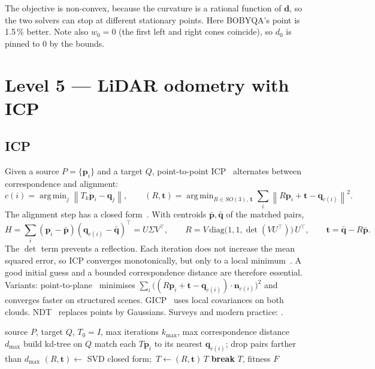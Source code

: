 \documentclass[10pt,a4paper]{scrartcl}
\renewcommand{\emph}[1]{\textcolor{accent}{#1}}
\newcommand{\code}[1]{\texttt{#1}}
\newcommand{\norm}[1]{\left\lVert #1 \right\rVert}
\DeclareMathOperator*{\argmin}{arg\,min}
\newcommand{\RuleSection}[1]{%
    \section{#1}%
    \vspace{0.2em}{\color{accent!35}\hrule height 0.4pt}\vspace{0.3em}%
  }
\begin{document}
  The objective is non-convex, because the curvature is a rational function of
  $\bm d$, so the two solvers can stop at different stationary points. Here BOBYQA's
  point is 1.5\,\% better. Note also $w_0=0$ (the first left and right cones coincide),
  so $d_0$ is pinned to 0 by the bounds.

  \RuleSection{Level 5 --- LiDAR odometry with ICP}
  \label{sec:l5}

  \subsection{ICP}
  \label{sec:icp}

  Given a source $P=\{\bm p_i\}$ and a target $Q$, point-to-point
  ICP~\citep{besl1992icp} alternates between correspondence and alignment:
  \begin{equation}
    c(i)=\argmin_j\norm{T_k\bm p_i-\bm q_j},\qquad
    (R,\bm t)=\argmin_{R\in SO(3),\,\bm t}\sum_i\norm{R\bm p_i+\bm t-\bm q_{c(i)}}^2 .
  \end{equation}
  The alignment step has a closed form~\citep{arun1987least,umeyama1991least,horn1987closed}.
  With centroids $\bar{\bm p},\bar{\bm q}$ of the matched pairs,
  \begin{equation}
    H=\sum_i(\bm p_i-\bar{\bm p})(\bm q_{c(i)}-\bar{\bm q})^\top=U\Sigma V^\top,\qquad
    R=V\,\mathrm{diag}\big(1,1,\det(VU^\top)\big)\,U^\top,\qquad
    \bm t=\bar{\bm q}-R\bar{\bm p}.
  \end{equation}
  The $\det$ term prevents a reflection. Each iteration does not increase the mean
  squared error, so ICP converges monotonically, but only to a \emph{local}
  minimum~\citep{besl1992icp}. A good initial guess and a bounded correspondence
  distance are therefore essential. Variants:
  point-to-plane~\citep{chen1992object} minimises
  $\sum_i\big((R\bm p_i+\bm t-\bm q_{c(i)})\cdot\bm n_{c(i)}\big)^2$ and converges
  faster on structured scenes. GICP~\citep{segal2009gicp} uses local covariances on
  both clouds. NDT~\citep{biber2003ndt} replaces points by Gaussians. Surveys and
  modern practice: \citet{rusinkiewicz2001efficient,pomerleau2015review,zhang2014loam,vizzo2023kiss}.

  \begin{algorithm}[H]
  \caption{Point-to-point ICP (PCL \code{IterativeClosestPoint})}
  \begin{algorithmic}[1]
  \Require source $P$, target $Q$, $T_0=I$, max iterations $k_{\max}$, max correspondence distance $d_{\max}$
  \State build kd-tree on $Q$
    \State match each $T\bm p_i$ to its nearest $\bm q_{c(i)}$; drop pairs farther than $d_{\max}$ 
    \State $(R,\bm t)\gets$ SVD closed form;\ $T\gets(R,\bm t)\,T$
     \textbf{break} \EndIf
  \EndFor
  \State \Return $T$, fitness $F$
  \end{algorithmic}
  \end{algorithm}
\end{document}
